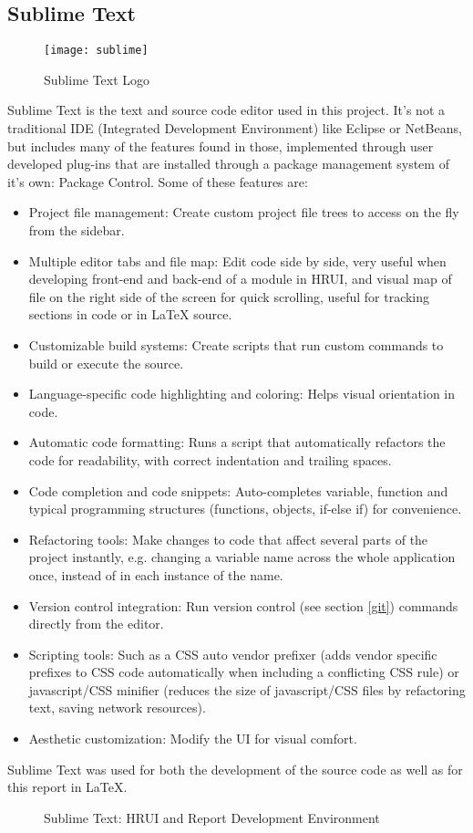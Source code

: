 \subsection{Sublime Text}
\begin{figure}[H]
\centering
\texttt{[image: sublime]}
\caption{Sublime Text Logo}
\end{figure}
Sublime Text is the text and source code editor used in this project. It's not a traditional IDE (Integrated Development
Environment) like Eclipse or NetBeans, but includes many of the features found in those, implemented through user developed
plug-ins that are installed through a package management system of it's own: Package Control. Some of these features are:
\begin{itemize}
  \item Project file management: Create custom project file trees to access on the fly from the sidebar.
  \item Multiple editor tabs and file map: Edit code side by side, very useful when developing front-end and back-end of a module in
  HRUI, and visual map of file on the right side of the screen for quick scrolling, useful for tracking sections in code or in \LaTeX
  source.
  \item Customizable build systems: Create scripts that run custom commands to build or execute the source.
  \item Language-specific code highlighting and coloring: Helps visual orientation in code.
  \item Automatic code formatting: Runs a script that automatically refactors the code for readability, with correct indentation and
  trailing spaces.
  \item Code completion and code snippets: Auto-completes variable, function and typical programming structures (functions, objects, 
  if-else if) for convenience.
  \item Refactoring tools: Make changes to code that affect several parts of the project instantly, e.g. changing a variable name across
  the whole application once, instead of in each instance of the name.
  \item Version control integration: Run version control (see section \ref{git}) commands directly from the editor.
  \item Scripting tools: Such as a CSS auto vendor prefixer (adds vendor specific prefixes to CSS code automatically when including a
  conflicting CSS rule) or javascript/CSS minifier (reduces the size of javascript/CSS files by refactoring text, saving network
  resources).
  \item Aesthetic customization: Modify the UI for visual comfort.
\end{itemize}
Sublime Text was used for both the development of the source code as well as for this report in \LaTeX.
\begin{figure}[H]
\centering
{}
\caption{Sublime Text: HRUI and Report Development Environment}
\end{figure}
